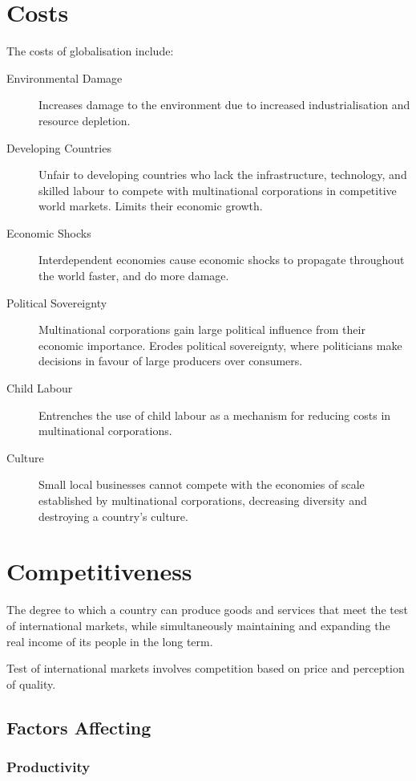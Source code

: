 \documentclass[a4paper,11pt]{article}
\begin{document}
\section{Costs}

The costs of globalisation include:

\begin{description}
\item [Environmental Damage] Increases damage to the environment due to
	increased industrialisation and resource depletion.
\item [Developing Countries] Unfair to developing countries who lack the
	infrastructure, technology, and skilled labour to compete with multinational
	corporations in competitive world markets. Limits their economic growth.
\item [Economic Shocks] Interdependent economies cause economic shocks to
	propagate throughout the world faster, and do more damage.
\item [Political Sovereignty] Multinational corporations gain large political
	influence from their economic importance. Erodes political sovereignty,
	where politicians make decisions in favour of large producers over
	consumers.
\item [Child Labour] Entrenches the use of child labour as a mechanism for
	reducing costs in multinational corporations.
\item [Culture] Small local businesses cannot compete with the economies of
	scale established by multinational corporations, decreasing diversity
	and destroying a country's culture.
\end{description}



\section{Competitiveness}

The degree to which a country can produce goods and services that meet the
test of international markets, while simultaneously maintaining and expanding
the real income of its people in the long term.

Test of international markets involves competition based on price and
perception of quality.


\subsection{Factors Affecting}

\subsubsection{Productivity}
\end{document}

